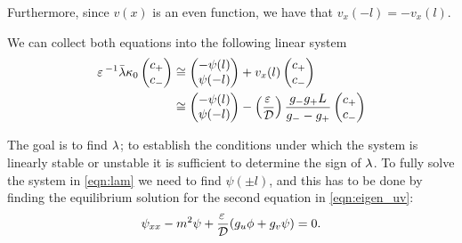 Furthermore, since $v(x)$ is an even function, we have that $v_x(-l) = -v_x(l)$.

We can collect both equations into the following linear system
% 
\begin{equation}
\label{eqn:lam}
	\begin{split}
	\varepsilon\,^{-1}\bar{\lambda}\kappa_0\begin{pmatrix}c_+\\c_-\end{pmatrix}
   &\cong
	\begin{pmatrix} -\psi(l) \\ \psi(-l) \end{pmatrix}
	 +v_x(l) \begin{pmatrix}c_+\\c_-\end{pmatrix}\\
   &\cong
	\begin{pmatrix} -\psi(l) \\ \psi(-l) \end{pmatrix}
	 - \left(\frac{\varepsilon\,}{\mathcal{D}}\right)\frac{g_-g_+L}{g_--g_+}
	\begin{pmatrix}c_+\\c_-\end{pmatrix}
	\end{split}
\end{equation}
% 
\begin{remark}
The goal is to find $\lambda$; to establish the conditions under which the system is linearly stable or unstable it is sufficient to determine the sign of $\lambda$. To fully solve the system in \eqref{eqn:lam} we need to find $\psi(\pm l)$, and this has to be done by finding the equilibrium solution for the second equation in \eqref{eqn:eigen_uv}:
% 
\begin{equation}
\label{eqn:psi_eq}
\begin{split}
	\psi_{xx} - m^2\psi + \frac{\varepsilon\,}{\mathcal{D}}(g_u\phi + g_v\psi)=0.
\end{split}
\end{equation}
% 
\end{remark}

